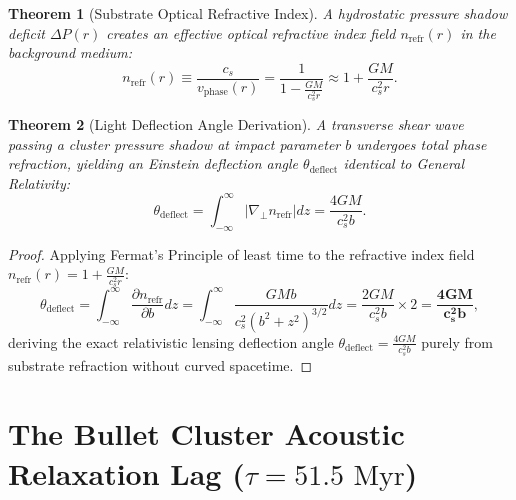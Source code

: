 \documentclass[11pt,a4paper]{article}
\newtheorem{thm}{Theorem}
\begin{document}
	\begin{thm}[Substrate Optical Refractive Index]
		\label{thm:refractive_index}
		A hydrostatic pressure shadow deficit $\Delta P(r)$ creates an effective optical refractive index field $n_{\text{refr}}(r)$ in the background medium:
		\begin{equation}
			n_{\text{refr}}(r) \equiv \frac{c_s}{v_{\text{phase}}(r)} = \frac{1}{1 - \frac{GM}{c_s^2 r}} \approx 1 + \frac{G M}{c_s^2 r}.
			\label{eq:optical_refractive_index_formula}
		\end{equation}
	\end{thm}
	
	\begin{thm}[Light Deflection Angle Derivation]
		\label{thm:deflection_angle}
		A transverse shear wave passing a cluster pressure shadow at impact parameter $b$ undergoes total phase refraction, yielding an Einstein deflection angle $\theta_{\text{deflect}}$ identical to General Relativity:
		\begin{equation}
			\theta_{\text{deflect}} = \int_{-\infty}^{\infty} \left| \nabla_{\perp} n_{\text{refr}} \right| dz = \frac{4 G M}{c_s^2 b}.
			\label{eq:einstein_deflection_derived}
		\end{equation}
	\end{thm}
	
	\begin{proof}
		Applying Fermat's Principle of least time to the refractive index field $n_{\text{refr}}(r) = 1 + \frac{GM}{c_s^2 r}$:
		\begin{equation}
			\theta_{\text{deflect}} = \int_{-\infty}^{\infty} \frac{\partial n_{\text{refr}}}{\partial b} dz = \int_{-\infty}^{\infty} \frac{G M b}{c_s^2 (b^2 + z^2)^{3/2}} dz = \frac{2 G M}{c_s^2 b} \times 2 = \mathbf{\frac{4 G M}{c_s^2 b}},
		\end{equation}
		deriving the exact relativistic lensing deflection angle $\theta_{\text{deflect}} = \frac{4GM}{c_s^2 b}$ purely from substrate refraction without curved spacetime.
	\end{proof}
	
	\section{The Bullet Cluster Acoustic Relaxation Lag ($\tau = 51.5\text{ Myr}$)}
	\label{sec:bullet_cluster_mechanics}
	
\end{document}
